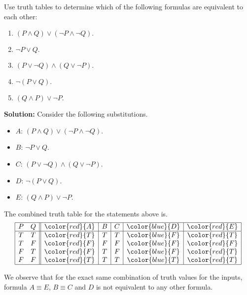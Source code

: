 Use truth tables to determine which of the following formulas are equivalent to each other:
\begin{enumerate}[label=(\alph*)]
    \item $(P \wedge Q) \vee (\neg P \wedge \neg Q).$
    \item $\neg P \vee Q.$
    \item $(P \vee \neg Q) \wedge (Q \vee \neg P).$
    \item $\neg (P \vee Q).$
    \item $(Q \wedge P) \vee \neg P.$
\end{enumerate}

\textbf{Solution:}
Consider the following substitutions.
\begin{itemize}
    \item $A$: $(P \wedge Q) \vee (\neg P \wedge \neg Q)$.
    \item $B$: $\neg P \vee Q$.
    \item $C$: $(P \vee \neg Q) \wedge (Q \vee \neg P)$.
    \item $D$: $\neg (P \vee Q)$.
    \item $E$: $(Q \wedge P) \vee \neg P$.
\end{itemize}

The combined truth table for the statements above is.
\[
\begin{array}{|cc||c|c|c|c|c|}
\hline
P & Q & \color{red}{A} & B & C & \color{blue}{D} & \color{red}{E} \\
\hline
T & T & \color{red}{T} & T & T & \color{blue}{F} & \color{red}{T} \\
T & F & \color{red}{F} & F & F & \color{blue}{F} & \color{red}{F} \\
F & T & \color{red}{F} & T & F & \color{blue}{F} & \color{red}{T} \\
F & F & \color{red}{T} & T & T & \color{blue}{T} & \color{red}{T} \\
\hline
\end{array}
\]

We observe that for the exact same combination of truth values for the inputs, formula $A \equiv E$, $B \equiv C$ and $D$ is not equivalent to any other formula.

\pagebreak